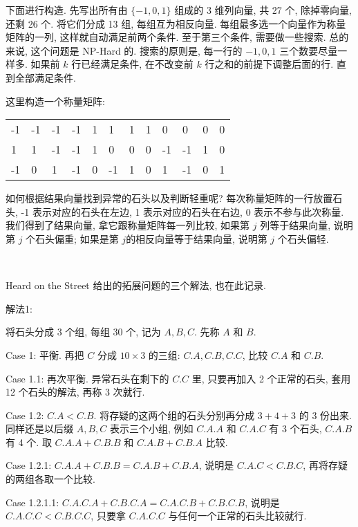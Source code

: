 下面进行构造. 先写出所有由 $ \{-1,0,1\} $ 组成的 3 维列向量, 共 27 个, 除掉零向量, 还剩 26 个. 将它们分成 13 组, 每组互为相反向量. 每组最多选一个向量作为称量矩阵的一列, 这样就自动满足前两个条件. 至于第三个条件, 需要做一些搜索. 总的来说, 这个问题是 NP-Hard 的. 搜索的原则是, 每一行的 $-1, 0, 1$ 三个数要尽量一样多. 如果前 $ k $ 行已经满足条件, 在不改变前 $ k $ 行之和的前提下调整后面的行. 直到全部满足条件.

这里构造一个称量矩阵:
\begin{figure*}[htbp]
\centering
\setlength\extrarowheight{2pt}
\begin{tabular}{|l|l|l|l|l|l|l|l|l|l|l|l|}
\hline
-1 & -1 & -1 & -1 &  1 &  1 &  1 &  1 &  0 &  0 &  0 &  0\\
 1 &  1 & -1 & -1 &  1 &  0 &  0 &  0 & -1 & -1 &  1 &  0\\
-1 &  0 &  1 & -1 &  0 & -1 &  1 &  0 &  1 & -1 &  0 &  1 \\
\hline
\end{tabular}
\end{figure*}

如何根据结果向量找到异常的石头以及判断轻重呢? 每次称量矩阵的一行放置石头, -1 表示对应的石头在左边, 1 表示对应的石头在右边, 0 表示不参与此次称量. 我们得到了结果向量, 拿它跟称量矩阵每一列比较, 如果第 $ j $ 列等于结果向量, 说明第 $ j $ 个石头偏重; 如果是第 $ j $的相反向量等于结果向量, 说明第 $ j $ 个石头偏轻. 


~

\noindent Heard on the Street 给出的拓展问题的三个解法, 也在此记录.

\noindent 解法1: 

将石头分成 3 个组, 每组 30 个, 记为 $ A, B, C $. 先称 $A$ 和 $B$.

Case 1: 平衡. 再把 $C$ 分成 $ 10\times 3 $ 的三组: $C.A, C.B, C.C$, 比较 $C.A$ 和 $C.B$.

Case 1.1: 再次平衡. 异常石头在剩下的 $C.C$ 里, 只要再加入 2 个正常的石头, 套用 12 个石头的解法, 再称 3 次就行.

Case 1.2: $C.A < C.B$. 将存疑的这两个组的石头分别再分成 $ 3+4+3 $ 的 3 份出来. 同样还是以后缀 $ A,B,C $ 表示三个小组, 例如 $C.A.A$ 和 $C.A.C$ 有 3 个石头, $ C.A.B $有 4 个. 取 $ C.A.A + C.B.B $ 和 $ C.A.B + C.B.A $ 比较.

Case 1.2.1: $ C.A.A + C.B.B = C.A.B + C.B.A $, 说明是 $ C.A.C < C.B.C $, 再将存疑的两组各取一个比较.

Case 1.2.1.1: $ C.A.C.A + C.B.C.A = C.A.C.B + C.B.C.B $, 说明是 $ C.A.C.C < C.B.C.C $, 只要拿 $ C.A.C.C $ 与任何一个正常的石头比较就行.

